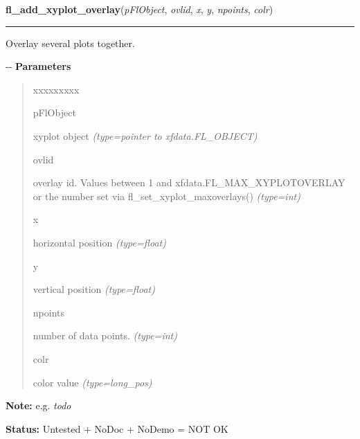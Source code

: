     \label{xformslib:flxyplot:fl_add_xyplot_overlay}

    \vspace{0.5ex}

\hspace{.8\funcindent}\begin{boxedminipage}{\funcwidth}

    \raggedright \textbf{fl\_add\_xyplot\_overlay}(\textit{pFlObject}, \textit{ovlid}, \textit{x}, \textit{y}, \textit{npoints}, \textit{colr})

    \vspace{-1.5ex}

    \rule{\textwidth}{0.5\fboxrule}
\setlength{\parskip}{2ex}

Overlay several plots together.

-{}-
\setlength{\parskip}{1ex}
      \textbf{Parameters}
      \vspace{-1ex}

      \begin{quote}
        \begin{Ventry}{xxxxxxxxx}

          \item[pFlObject]


xyplot object
            {\it (type=pointer to xfdata.FL\_OBJECT)}

          \item[ovlid]


overlay id. Values between 1 and xfdata.FL\_MAX\_XYPLOTOVERLAY or the
number set via fl\_set\_xyplot\_maxoverlays()
            {\it (type=int)}

          \item[x]


horizontal position
            {\it (type=float)}

          \item[y]


vertical position
            {\it (type=float)}

          \item[npoints]


number of data points.
            {\it (type=int)}

          \item[colr]


color value
            {\it (type=long\_pos)}

        \end{Ventry}

      \end{quote}

\textbf{Note:} 
e.g. \emph{todo}


\textbf{Status:} 
Untested + NoDoc + NoDemo = NOT OK


    \end{boxedminipage}

